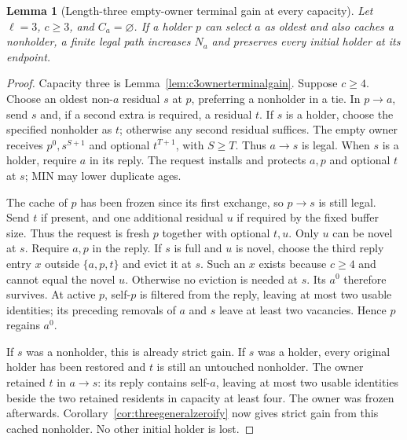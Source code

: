 \documentclass[11pt]{article}
\newtheorem{lemma}[theorem]{Lemma}
\begin{document}
\begin{lemma}[Length-three empty-owner terminal gain at every capacity]
\label{lem:threeownerterminalgain}
Let $\ell=3$, $c\ge3$, and $C_a=\varnothing$. If a holder
$p$ can select $a$ as oldest and also caches a nonholder,
a finite legal path increases $N_a$ and preserves every
initial holder at its endpoint.
\end{lemma}
\begin{proof}
Capacity three is Lemma~\ref{lem:c3ownerterminalgain}.
Suppose $c\ge4$. Choose an oldest non-$a$ residual $s$ at
$p$, preferring a nonholder in a tie. In $p\to a$, send
$s$ and, if a second extra is required, a residual $t$.
If $s$ is a holder, choose the specified nonholder as $t$;
otherwise any second residual suffices. The empty owner
receives $p^0,s^{S+1}$ and optional $t^{T+1}$, with $S\ge T$.
Thus $a\to s$ is legal. When $s$ is a holder, require $a$
in its reply. The request installs and protects
$a,p$ and optional $t$ at $s$; MIN may lower duplicate ages.

The cache of $p$ has been frozen since its first exchange,
so $p\to s$ is still legal. Send $t$ if present, and one
additional residual $u$ if required by the fixed buffer size.
Thus the request is fresh $p$ together with optional $t,u$.
Only $u$ can be novel at $s$. Require $a,p$ in the reply.
If $s$ is full and $u$ is novel, choose the third reply entry
$x$ outside $\{a,p,t\}$ and evict it at $s$. Such an $x$
exists because $c\ge4$ and cannot equal the novel $u$.
Otherwise no eviction is needed at $s$. Its $a^0$ therefore
survives. At active $p$, self-$p$ is filtered from the reply,
leaving at most two usable identities; its preceding removals
of $a$ and $s$ leave at least two vacancies. Hence $p$ regains
$a^0$.

If $s$ was a nonholder, this is already strict gain. If $s$
was a holder, every original holder has been restored and
$t$ is still an untouched nonholder. The owner retained $t$
in $a\to s$: its reply contains self-$a$, leaving at most
two usable identities beside the two retained residents in
capacity at least four. The owner was frozen afterwards.
Corollary~\ref{cor:threegeneralzeroify} now gives strict gain
from this cached nonholder. No other initial holder is lost.
\end{proof}
\end{document}
